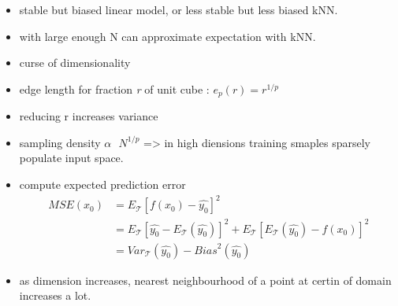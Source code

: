 \documentclass[11pt]{article}
\providecommand{\tightlist}{%
      \setlength{\itemsep}{0pt}\setlength{\parskip}{0pt}}
\begin{document}
\begin{itemize}
\tightlist
\item
  stable but biased linear model, or less stable but less biased kNN.
\item
  with large enough N can approximate expectation with kNN.
\item
  curse of dimensionality
\item
  edge length for fraction \emph{r} of unit cube :
  \(e_{p}(r) = r^{1/p}\)
\item
  reducing r increases variance
\item
  sampling density \(\alpha\text{ }N^{1/p}\) =\textgreater{} in high
  diensions training smaples sparsely populate input space.
\item
  compute expected prediction error \[
  \begin{align} 
  MSE(x_{0}) &= E_{\mathcal{T}}[f(x_{0}) - \hat{y_{0}}]^{2} \\
  &= E_{\mathcal{T}}[\hat{y_{0}} - E_{\mathcal{T}}(\hat{y_{0}})]^{2} + E_{\mathcal{T}}[E_{\mathcal{T}}(\hat{y_{0}}) - f(x_{0})]^{2} \\
  &= Var_{\mathcal{T}}(\hat{y_{0}}) - {Bias}^{2}(\hat{y_{0}})
  \end{align}
  \]
\item
  as dimension increases, nearest neighbourhood of a point at certin of
  domain increases a lot.
\end{itemize}
\end{document}

